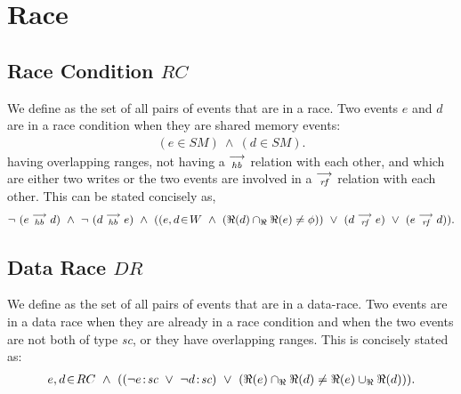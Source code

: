         
    \section{Race}
        
        \subsection{Race Condition $RC$} 
            We define  as the set of all pairs of events that are in a race. Two events $e$ and $d$ are in a race condition when they are shared memory events:
            \begin{align*}
                (e \in SM)\ \wedge\ (d \in SM).
            \end{align*}
            having overlapping ranges, not having a $\stackrel{\longrightarrow}{_\textit{hb}}$ relation with each other, and which are either two writes or the two events are involved in a $\stackrel{\longrightarrow}{_\textit{rf}}$ relation with each other. This can be stated concisely as,
            \begin{align*}
                \neg \ (\reln{e}{hb}{d})\ \wedge\ \neg \ (\reln{d}{hb}{e}) 
                \ \wedge \ 
                (
                (\event{e,d}{W}\  \wedge\ (\Re(d) \cap_{\Re} \Re(e) \neq \phi)) 
                    \  \vee\ (d \stck{_\textit{rf}} e)\ \vee\ (e \stck{_\textit{rf}} d)
                ).
            \end{align*}
                    
        \subsection{Data Race $DR$} 
            We define  as the set of all pairs of events that are in a data-race. Two events are in a data race when they are already in a race condition and when the two events are not both of type \textit{sc}, or they have overlapping ranges. This is concisely stated as:  
            \begin{align*}
                \event{e,d}{RC}  \ \wedge \ 
                ((\neg\et{e}{sc} \ \vee \ \neg\et{d}{sc}) \ \vee \ 
                (\Re(e) \cap_{\Re} \Re(d) \neq \Re(e) \cup_{\Re} \Re(d))). 
            \end{align*}
            
        
